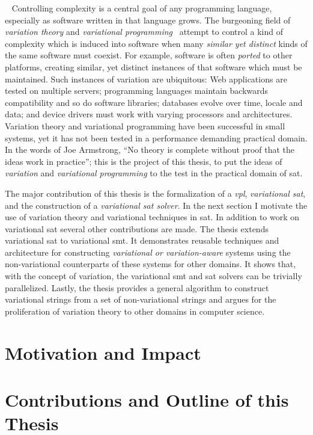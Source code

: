 ~\label{chapter:introduction}%
%
Controlling complexity is a central goal of any programming language, especially
as software written in that language grows. The burgeoning field of
\emph{variation theory} and \emph{variational
  programming}~\cite{EW11gttse,EW11tosem,HW16fosd,CEW16ecoop,Walk14onward}
attempt to control a kind of complexity which is induced into software when many
\emph{similar yet distinct} kinds of the same software must coexist. For
example, software is often \emph{ported} to other platforms, creating similar,
yet distinct instances of that software which must be maintained. Such instances
of variation are ubiquitous: Web applications are tested on multiple servers;
programming languages maintain backwards compatibility and so do software
libraries; databases evolve over time, locale and data; and device drivers must
work with varying processors and architectures. Variation theory and variational
programming have been successful in small systems, yet it has not been tested in a performance demanding
practical domain. In the words of Joe Armstrong\cite{armstrongThesis}, ``No
theory is complete without proof that the ideas work in practice''; this is the
project of this thesis, to put the ideas of \emph{variation} and
\emph{variational programming} to the test in the practical domain of \ac{sat}.

The major contribution of this thesis is the formalization of a \emph{\ac{vpl}},
\emph{variational \acl{sat}}, and the construction of a \emph{variational
  \ac{sat} solver}. In the next section I motivate the use of variation theory
and variational techniques in \acl{sat}. In addition to work on variational
\ac{sat} several other contributions are made. The thesis extends variational
\acl{sat} to variational \ac{smt}. It demonstrates reusable techniques and
architecture for constructing \emph{variational or variation-aware} systems
using the non-variational counterparts of these systems for other domains. It
shows that, with the concept of variation, the variational \ac{smt} and \ac{sat}
solvers can be trivially parallelized. Lastly, the thesis provides a general
algorithm to construct variational strings from a set of non-variational strings
and argues for the proliferation of variation theory to other domains in
computer science.

\section{Motivation and Impact}


\section{Contributions and Outline of this Thesis}


